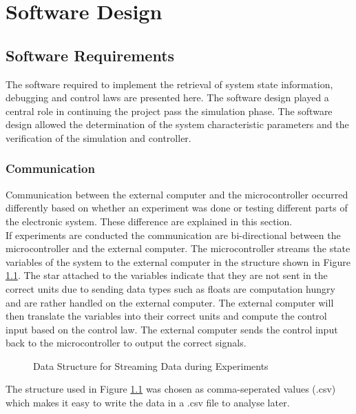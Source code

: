 \chapter{Software Design}
\label{chp5:software}
\section{Software Requirements}
\label{sec:software_requirements}
The software required to implement the retrieval of system state information, debugging and control laws are presented here. The software design played a central role in continuing the project pass the simulation phase. The software design allowed the determination of the system characteristic parameters and the verification of the simulation and controller.

\subsection{Communication}

Communication between the external computer and the microcontroller occurred differently based on whether an experiment was done or testing different parts of the electronic system. These difference are explained in this section.\\

If experiments are conducted the communication are bi-directional between the microcontroller and the external computer. The microcontroller streams the state variables of the system to the external computer in the structure shown in Figure \ref{fig:data_struct}. The star attached to the variables indicate that they are not sent in the correct units due to sending data types such as floats are computation hungry and are rather handled on the external computer. The external computer will then translate the variables into their correct units and compute the control input based on the control law. The external computer sends the control input back to the microcontroller to output the correct signals.\\

\begin{figure}[h]
	\centering
	
	\caption{Data Structure for Streaming Data during Experiments}
	\label{fig:data_struct}
\end{figure}

The structure used in Figure \ref{fig:data_struct} was chosen as comma-seperated values (.csv) which makes it easy to write the data in a .csv file to analyse later.\\


